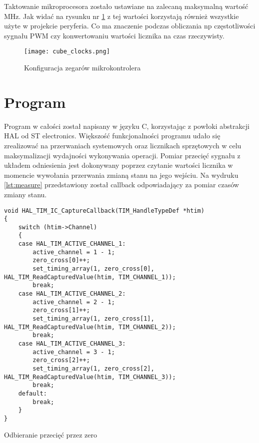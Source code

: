 Taktowanie mikroprocesora zostało ustawiane na zalecaną maksymalną wartość \unit[80]{MHz}. 
Jak widać na rysunku nr \ref{fig:cube_clocks} z tej wartości korzystają również wszystkie użyte w projekcie peryferia. 
Co ma znaczenie podczas obliczania np częstotliwości sygnału PWM czy konwertowaniu wartości licznika na czas rzeczywisty.

\begin{figure}[ht!]
    \centering
    \texttt{[image: cube\_clocks.png]}
    \caption{Konfiguracja zegarów mikrokontrolera}
    \label{fig:cube_clocks}
\end{figure}

\clearpage
\section{Program}
Program w całości został napisany w języku C, korzystając z powłoki abstrakcji HAL od ST electronics. 
Większość funkcjonalności programu udało się zrealizować na przerwaniach systemowych oraz licznikach sprzętowych w celu maksymalizacji wydajności wykonywania operacji.
Pomiar przecięć sygnału  z układem odniesienia jest dokonywany poprzez czytanie wartości licznika w momencie wywołania przerwania zmianą stanu na jego wejściu.
Na wydruku \ref{lst:measure} przedstawiony został callback odpowiadający za pomiar czasów zmiany stanu.


\begin{listing}[tp]
    \begin{verbatim}
void HAL_TIM_IC_CaptureCallback(TIM_HandleTypeDef *htim)
{
    switch (htim->Channel)
    {
    case HAL_TIM_ACTIVE_CHANNEL_1:
        active_channel = 1 - 1;
        zero_cross[0]++;
        set_timing_array(1, zero_cross[0], HAL_TIM_ReadCapturedValue(htim, TIM_CHANNEL_1));
        break;
    case HAL_TIM_ACTIVE_CHANNEL_2:
        active_channel = 2 - 1;
        zero_cross[1]++;
        set_timing_array(1, zero_cross[1], HAL_TIM_ReadCapturedValue(htim, TIM_CHANNEL_2));
        break;
    case HAL_TIM_ACTIVE_CHANNEL_3:
        active_channel = 3 - 1;
        zero_cross[2]++;
        set_timing_array(1, zero_cross[2], HAL_TIM_ReadCapturedValue(htim, TIM_CHANNEL_3));
        break;
    default:
        break;
    }
}
    \end{verbatim}
\caption{Odbieranie przecięć przez zero}
\label{lst:measure}
\end{listing}

